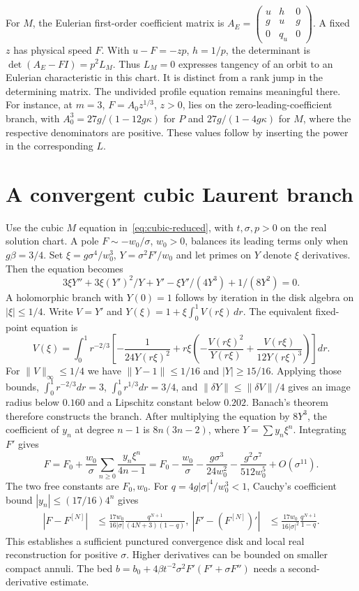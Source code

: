 \documentclass[12pt,a4paper,oneside]{report}
\numberwithin{equation}{chapter}
\theoremstyle{remark}\newtheorem{remark}[theorem]{Remark}
\begin{document}
For $M$, the Eulerian first-order coefficient matrix is
$A_E=\left(\begin{smallmatrix} u&h&0\\g&u&g\\0&q_u&0\end{smallmatrix}\right)$.
A fixed $z$ has physical speed $F$. With $u-F=-zp$, $h=1/p$, the determinant is
$\det(A_E-FI)=p^2 L_M$. Thus $L_M=0$ expresses tangency of an orbit to an Eulerian characteristic in this chart. It is distinct from a rank jump in the determining matrix. The undivided profile equation remains meaningful there. For instance, at $m=3$, $F=A_0z^{1/3}$, $z>0$, lies on the zero-leading-coefficient branch, with $A_0^3=27g/(1-12g\kappa)$ for $P$ and $27g/(1-4g\kappa)$ for $M$, where the respective denominators are positive. These values follow by inserting the power in the corresponding $L$.

\section{A convergent cubic Laurent branch}
Use the cubic $M$ equation in~\eqref{eq:cubic-reduced}, with $t,\sigma,p>0$ on the real solution chart. A pole $F\sim-w_0/\sigma$, $w_0>0$, balances its leading terms only when $g\beta=3/4$. Set $\xi=g\sigma^4/w_0^3$, $Y=\sigma^2 F'/w_0$ and let primes on $Y$ denote $\xi$ derivatives. Then the equation becomes
\[
 3\xi Y''+3\xi(Y')^2/Y+Y'-\xi Y'/(4Y^3)+1/(8Y^2)=0 .
\]
A holomorphic branch with $Y(0)=1$ follows by iteration in the disk algebra on $|\xi|\le1/4$. Write $V=Y'$ and $Y(\xi)=1+\xi\int_0^1V(r\xi)\,dr$. The equivalent fixed-point equation is
\[
 V(\xi)=\int_0^1 r^{-2/3}\left[-\frac{1}{24Y(r\xi)^2}
   +r\xi\left(-\frac{V(r\xi)^2}{Y(r\xi)}
                +\frac{V(r\xi)}{12Y(r\xi)^3}\right)\right]dr .
\]
For $\|V\|_\infty\le1/4$ we have $\|Y-1\|\le1/16$ and $|Y|\ge15/16$. Applying those bounds, $\int_0^1 r^{-2/3}dr=3$, $\int_0^1r^{1/3}dr=3/4$, and $\|\delta Y\|\le\|\delta V\|/4$ gives an image radius below $0.160$ and a Lipschitz constant below $0.202$. Banach's theorem therefore constructs the branch. After multiplying the equation by $8Y^3$, the coefficient of $y_n$ at degree $n-1$ is $8n(3n-2)$, where $Y=\sum y_n\xi^n$. Integrating $F'$ gives
\[
 F=F_0+\frac{w_0}{\sigma}\sum_{n\ge0}\frac{y_n\xi^n}{4n-1}
   =F_0-\frac{w_0}{\sigma}-\frac{g\sigma^3}{24w_0^2}
                  -\frac{g^2\sigma^7}{512w_0^5}+O(\sigma^{11}) .
\]
The two free constants are $F_0,w_0$. For $q=4g|\sigma|^4/w_0^3<1$, Cauchy's coefficient bound $|y_n|\le (17/16)4^n$ gives
\begin{align*}
 |F-F^{[N]}|&\le\frac{17w_0}{16|\sigma|}
                 \frac{q^{N+1}}{(4N+3)(1-q)},\
 |F'-(F^{[N]})'|&\le\frac{17w_0}{16|\sigma|^2}
                 \frac{q^{N+1}}{1-q}.
\end{align*}
This establishes a sufficient punctured convergence disk and local real reconstruction for positive $\sigma$. Higher derivatives can be bounded on smaller compact annuli. The bed $b=b_0+4\beta t^{-2}\sigma^2 F'(F'+\sigma F'')$ needs a second-derivative estimate.
\end{document}
